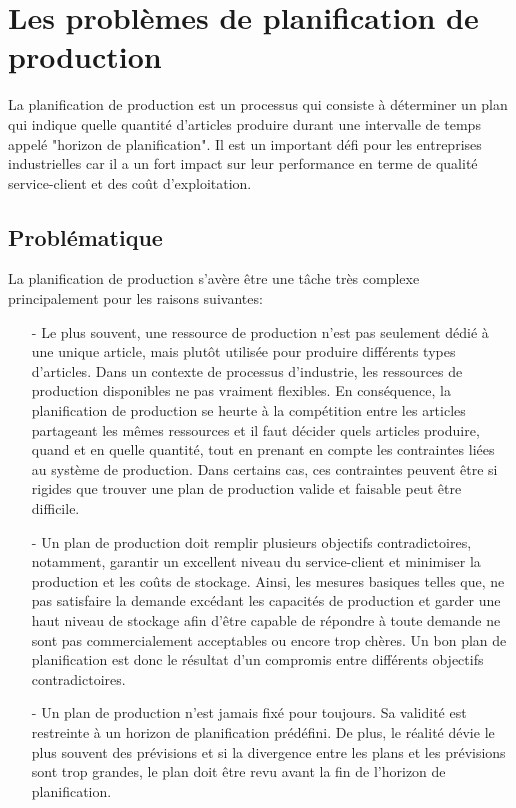 \documentclass[12pt,a4paper]{article}
\begin{document}
		\section{Les problèmes de planification de production}
	La planification de production est un processus qui consiste à déterminer un plan qui indique quelle quantité d'articles produire durant une intervalle de temps appelé "horizon de planification". Il est un important défi pour les entreprises industrielles car il a un fort impact sur leur performance en terme de qualité service-client et des coût d'exploitation.	\subsection{Problématique}
		
 La planification de production s'avère être une tâche très complexe principalement pour les raisons suivantes:
 \begin{itemize}
 	\item[-] Le plus souvent, une ressource de production n'est pas seulement dédié à une unique article, mais plutôt utilisée pour produire différents types d'articles. Dans un contexte de processus d'industrie, les ressources de production disponibles ne pas vraiment flexibles. En conséquence, la planification de production se heurte à la compétition entre les articles partageant les mêmes ressources et il faut décider quels articles produire, quand et en quelle quantité, tout en prenant en compte les contraintes liées au système de production. Dans certains cas, ces contraintes peuvent être si rigides que trouver une plan de production valide et faisable peut être difficile.
 	
 	\item[-] Un plan de production doit remplir plusieurs objectifs contradictoires, notamment, garantir un excellent niveau du service-client et minimiser la production et les coûts de stockage. Ainsi, les mesures basiques telles que, ne pas satisfaire la demande excédant les capacités de production et garder une haut niveau de stockage afin d'être capable de répondre à toute demande ne sont pas commercialement acceptables ou encore trop chères. Un bon plan de planification est donc le résultat d'un compromis entre différents objectifs contradictoires.
 	\item[-] Un plan de production n'est jamais fixé pour toujours. Sa validité est restreinte à un horizon de planification prédéfini. De plus, le réalité dévie le plus souvent des prévisions et si la divergence entre les plans et les prévisions sont trop grandes, le plan doit être revu avant la fin de l'horizon de planification.
 \end{itemize}
 
\end{document}
